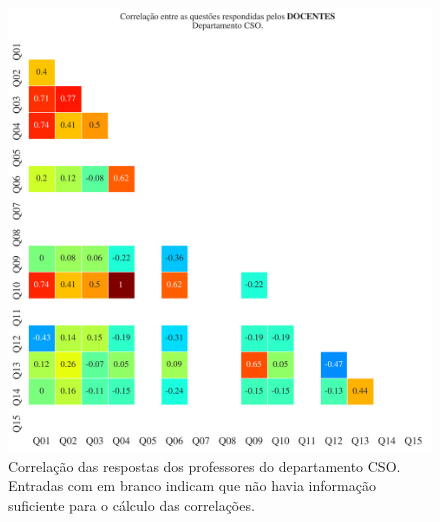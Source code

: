 \documentclass[a4paper,10pt]{article}
\begin{document}
\begin{figure}[h]
\centering
\includegraphics[width=0.999\linewidth]{matriz_corr__CSO_docentes.png}
\caption{\label{fig:corr_docentes}Correlação das respostas dos professores do departamento CSO. Entradas com em branco indicam que não havia informação suficiente para o cálculo das correlações.}
\end{figure}
\end{document}
